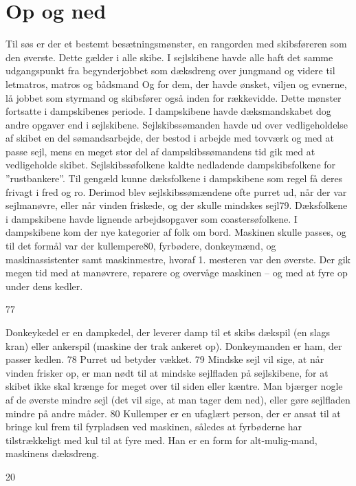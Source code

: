 \chapter{Op og ned}\label{op-og-ned}

Til søs er der et bestemt besætningsmønster, en rangorden med
skibsføreren som den øverste. Dette gælder i alle skibe. I sejlskibene
havde alle haft det samme udgangspunkt fra begynderjobbet som dæksdreng
over jungmand og videre til letmatros, matros og bådsmand Og for dem,
der havde ønsket, viljen og evnerne, lå jobbet som styrmand og
skibsfører også inden for rækkevidde. Dette mønster fortsatte i
dampskibenes periode. I dampskibene havde dæksmandskabet dog andre
opgaver end i sejlskibene. Sejlskibssømanden havde ud over
vedligeholdelse af skibet en del sømandsarbejde, der bestod i arbejde
med tovværk og med at passe sejl, mens en meget stor del af
dampskibssømandens tid gik med at vedligeholde skibet.
Sejlskibssøfolkene kaldte nedladende dampskibsfolkene for
''rustbankere''. Til gengæld kunne dæksfolkene i dampskibene som regel
få deres frivagt i fred og ro. Derimod blev sejlskibssømændene ofte
purret ud, når der var sejlmanøvre, eller når vinden friskede, og der
skulle mindskes sejl79. Dæksfolkene i dampskibene havde lignende
arbejdsopgaver som coastersøfolkene. I dampskibene kom der nye
kategorier af folk om bord. Maskinen skulle passes, og til det formål
var der kullempere80, fyrbødere, donkeymænd, og maskinassistenter samt
maskinmestre, hvoraf 1. mesteren var den øverste. Der gik megen tid med
at manøvrere, reparere og overvåge maskinen -- og med at fyre op under
dens kedler.

77

Donkeykedel er en dampkedel, der leverer damp til et skibs dækspil (en
slags kran) eller ankerspil (maskine der trak ankeret op). Donkeymanden
er ham, der passer kedlen. 78 Purret ud betyder vækket. 79 Mindske sejl
vil sige, at når vinden frisker op, er man nødt til at mindske
sejlfladen på sejlskibene, for at skibet ikke skal krænge for meget over
til siden eller kæntre. Man bjærger nogle af de øverste mindre sejl (det
vil sige, at man tager dem ned), eller gøre sejlfladen mindre på andre
måder. 80 Kullemper er en ufaglært person, der er ansat til at bringe
kul frem til fyrpladsen ved maskinen, således at fyrbøderne har
tilstrækkeligt med kul til at fyre med. Han er en form for
alt-mulig-mand, maskinens dæksdreng.

20

